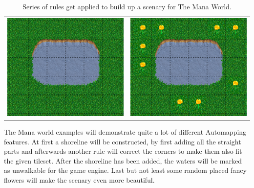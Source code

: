 \begin{table}
\begin{tabular}{c c}
	    \includegraphics[scale=1]{Example/TheManaWorld/flow3.eps} &
	    \includegraphics[scale=1]{Example/TheManaWorld/flow4.eps} \\
		\end{tabular}
  \caption{Series of rules get applied to build up a scenary for The Mana World.}
\end{table}

The Mana world examples will demonstrate quite a lot of different Automapping
features. At first a shoreline will be constructed, by first adding all
the straight parts and afterwards another rule will correct the corners
to make them also fit the given tileset. After the shoreline has been added,
the waters will be marked as unwalkable for the game engine. Last but not least
some random placed fancy flowers will make the scenary even more beautiful.




